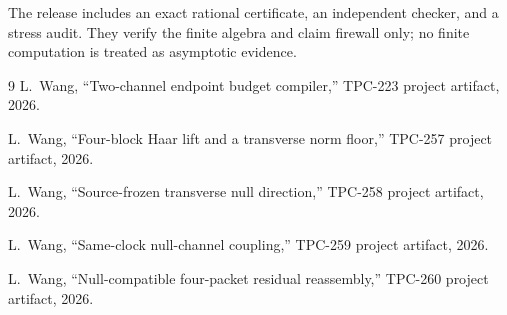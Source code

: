 \documentclass[11pt]{article}
\theoremstyle{definition}
\begin{document}
The release includes an exact rational certificate, an independent checker, and
a stress audit.  They verify the finite algebra and claim firewall only; no
finite computation is treated as asymptotic evidence.

\begin{thebibliography}{9}
L.~Wang, ``Two-channel endpoint budget compiler,'' TPC-223 project artifact,
2026.

L.~Wang, ``Four-block Haar lift and a transverse norm floor,'' TPC-257 project
artifact, 2026.

L.~Wang, ``Source-frozen transverse null direction,'' TPC-258 project artifact,
2026.

L.~Wang, ``Same-clock null-channel coupling,'' TPC-259 project artifact, 2026.

L.~Wang, ``Null-compatible four-packet residual reassembly,'' TPC-260 project
artifact, 2026.
\end{thebibliography}
\end{document}
